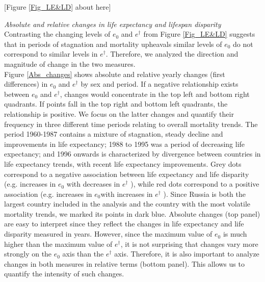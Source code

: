 \documentclass{article}
\begin{document}
\begin{spacing}{1.5}
\begin{center}
[Figure \ref{Fig_LE&LD} about here]
\end{center}

\emph{Absolute and relative changes in life expectancy and lifespan disparity}\\

Contrasting the changing levels of $e_0$ and $e^\dagger$ from Figure \ref{Fig_LE&LD} suggests that in periods of stagnation and mortality upheavals  similar levels of $e_0$ do not correspond to similar levels in $e^\dagger$. Therefore, we analyzed the direction and magnitude of change in the two measures. \\

Figure \ref{Abs_changes} shows absolute and relative yearly changes (first differences) in $e_0$ and $e^\dagger$ by sex and period. If a negative relationship exists between $e_0$ and $e^\dagger$, changes would concentrate in the top left and bottom right quadrants. If points fall in the top right and bottom left quadrants, the relationship is positive. We focus on the latter changes and quantify their frequency in three different time periods relating to overall mortality trends. The period 1960-1987 contains a mixture of stagnation, steady decline and improvements in life expectancy; 1988 to 1995 was a period of decreasing life expectancy; and 1996 onwards is characterized by divergence between countries in life expectancy trends, with recent life expectancy improvements. Grey dots correspond to a negative association between life expectancy and life disparity (e.g. increases in $e_0$ with decreases in $e^\dagger$ ), while red dots correspond to a positive association (e.g. increases in $e_0$with increases in $e^\dagger$ ). Since Russia is both the largest country included in the analysis and the country with the most volatile mortality trends, we marked its points in dark blue. Absolute changes (top panel) are easy to interpret since they reflect the changes in life expectancy and life disparity measured in years. However, since the maximum value of $e_0$ is much higher than the maximum value of $e^\dagger$, it is not surprising that changes vary more strongly on the  $e_0$ axis than the $e^\dagger$ axis. Therefore, it is also important to analyze changes in both measures in relative terms (bottom panel).  This allows us to quantify the intensity of such changes.\\


\end{spacing}
\end{document}
